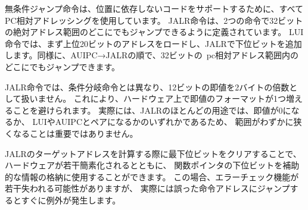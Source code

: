 \begin{commentary}
\begin{comment}
The unconditional jump instructions all use PC-relative addressing to
help support position-independent code.  The JALR instruction was
defined to enable a two-instruction sequence to jump anywhere in a
32-bit absolute address range.  A LUI instruction can first load {\em
  rs1} with the upper 20 bits of a target address, then JALR can add
in the lower bits. Similarly, AUIPC then JALR can jump
anywhere in a 32-bit {\tt pc}-relative address range.
\end{comment}

無条件ジャンプ命令は、位置に依存しないコードをサポートするために、すべてPC相対アドレッシングを使用しています。 JALR命令は、2つの命令で32ビットの絶対アドレス範囲のどこにでもジャンプできるように定義されています。 LUI命令では、まず上位20ビットのアドレスをロードし、JALRで下位ビットを追加します。同様に、AUIPC→JALRの順で、32ビットの{\ pc}相対アドレス範囲内のどこにでもジャンプできます。

\begin{comment}
Note that the JALR instruction does not treat the 12-bit immediate as
multiples of 2 bytes, unlike the conditional branch instructions.
This avoids one more immediate format in hardware.  In
practice, most uses of JALR will have either a zero immediate or be
paired with a LUI or AUIPC, so the slight reduction in range is not
significant.
\end{comment}

JALR命令では、条件分岐命令とは異なり、12ビットの即値を2バイトの倍数として扱いません。
これにより、ハードウェア上で即値のフォーマットが1つ増えることを避けられます。 
実際には、JALRのほとんどの用途では、即値が0になるか、
LUIやAUIPCとペアになるかのいずれかであるため、
範囲がわずかに狭くなることは重要ではありません。

\begin{comment}
Clearing the least-significant bit when calculating the JALR target
address both simplifies the hardware slightly and allows the
low bit of function pointers to be used to store auxiliary
information.  Although there is potentially a slight loss of error
checking in this case, in practice jumps to an incorrect instruction
address will usually quickly raise an exception.
\end{comment}

JALRのターゲットアドレスを計算する際に最下位ビットをクリアすることで、
ハードウェアが若干簡素化されるとともに、
関数ポインタの下位ビットを補助的な情報の格納に使用することができます。
この場合、エラーチェック機能が若干失われる可能性がありますが、
実際には誤った命令アドレスにジャンプするとすぐに例外が発生します。


\end{commentary}
